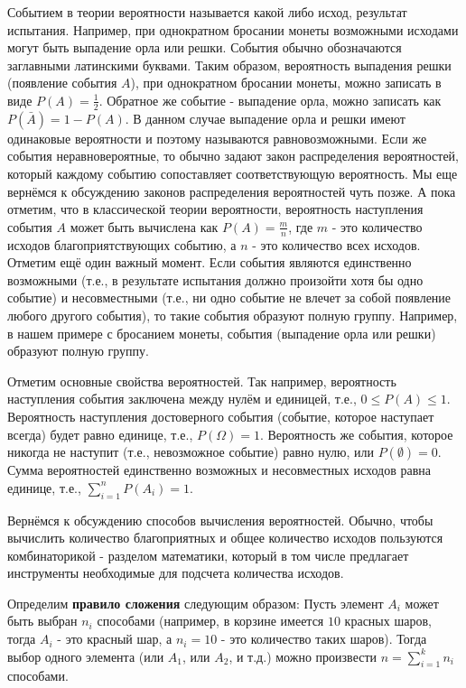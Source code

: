 Событием в теории вероятности называется какой либо исход, 
результат испытания. Например, при однократном бросании 
монеты возможными исходами могут быть выпадение орла или 
решки. События обычно обозначаются заглавными 
латинскими буквами. Таким образом, вероятность выпадения решки (появление 
события $A$), при однократном бросании монеты, можно записать в виде 
$P(A) = \frac{1}{2}$. Обратное же событие - выпадение орла, 
можно записать как $P(\bar{A})=1-P(A)$. В данном случае 
выпадение орла и решки имеют одинаковые вероятности и поэтому называются 
равновозможными. Если же события неравновероятные, то обычно 
задают закон распределения вероятностей, который каждому 
событию сопоставляет соответствующую вероятность. Мы еще вернёмся к
обсуждению законов распределения вероятностей чуть позже. А пока отметим, что 
в классической теории вероятности, вероятность наступления события $A$
может быть вычислена как $P(A)=\frac{m}{n}$, где $m$ - это 
количество исходов благоприятствующих событию, а $n$ - это количество
всех исходов. Отметим ещё один важный момент. Если события 
являются единственно возможными (т.е., в результате испытания
должно произойти хотя бы одно событие) и несовместными (т.е., ни одно 
событие не влечет за собой появление любого другого события), то такие события 
образуют полную группу. Например, в нашем примере с бросанием
монеты, события (выпадение орла или решки) образуют полную группу.

Отметим основные свойства вероятностей. Так например, вероятность 
наступления события заключена между нулём и единицей, т.е., $0 \le P(A) \le 1$.
Вероятность наступления достоверного события (событие, которое наступает
всегда) будет равно единице, т.е., $P(\Omega) = 1$. Вероятность же 
события, которое никогда не наступит (т.е., невозможное событие)
равно нулю, или $P(\emptyset)=0$. Сумма вероятностей единственно возможных и 
несовместных исходов равна единице, т.е., $\sum_{i=1}^nP(A_i)=1$.

Вернёмся к обсуждению способов вычисления вероятностей. Обычно, 
чтобы вычислить количество благоприятных и общее количество 
исходов пользуются комбинаторикой - разделом математики, 
который в том числе предлагает инструменты необходимые для 
подсчета количества исходов. 

Определим \textbf{правило сложения} следующим образом:
Пусть элемент $A_i$ может быть выбран $n_i$ способами (например,
в корзине имеется $10$ красных шаров, тогда $A_i$ - это красный шар, а $n_i=10$
- это количество таких шаров). Тогда выбор одного элемента 
(или $A_1$, или $A_2$, и т.д.) можно произвести 
$n = \sum_{i=1}^k n_i$ способами.


